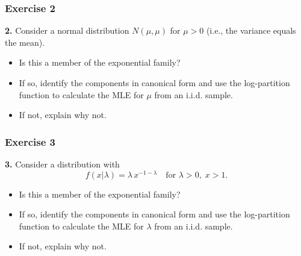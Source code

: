 \documentclass{beamer}
\begin{document}
\begin{frame}
\frametitle{Exercise 2}
\textbf{2.} Consider a normal distribution $N(\mu,\mu)$ for $\mu > 0$ (i.e., the variance equals the mean).
\begin{itemize}
  \item Is this a member of the exponential family?
  \item If so, identify the components in canonical form and use the log-partition function to calculate the MLE for $\mu$ from an i.i.d. sample.
  \item If not, explain why not.
\end{itemize}
\end{frame}

\begin{frame}
\frametitle{Exercise 3}
\textbf{3.} Consider a distribution with
\[
f(x|\lambda) = \lambda\, x^{-1-\lambda} \quad \text{for } \lambda>0,\; x>1.
\]
\begin{itemize}
  \item Is this a member of the exponential family?
  \item If so, identify the components in canonical form and use the log-partition function to calculate the MLE for $\lambda$ from an i.i.d. sample.
  \item If not, explain why not.
\end{itemize}
\end{frame}
\end{document}
